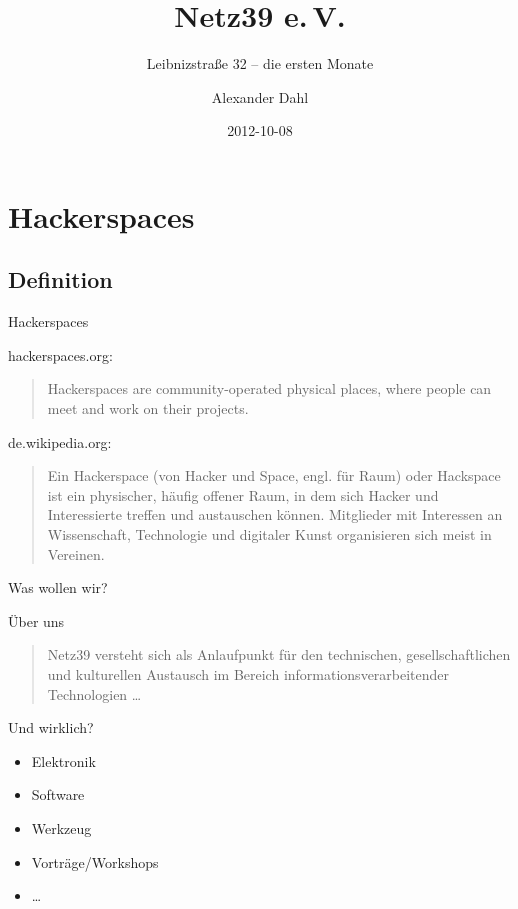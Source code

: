\documentclass[hyperref={pdfpagelabels=false}]{beamer}
\title[Netz39 e.\,V.]{Netz39 e.\,V.}
\subtitle{Leibnizstraße 32 -- die ersten Monate}
\author{Alexander Dahl}
\institute[netz39.de]{\url{http://www.netz39.de/}}
\date{2012-10-08}
\begin{document}
\begin{frame}
	\titlepage
\end{frame}


\section{Hackerspaces}

\subsection{Definition}

\begin{frame}{Hackerspaces}
    \begin{block}{hackerspaces.org:}
        \begin{quote}
            Hackerspaces are community-operated physical places, where
            people can meet and work on their projects.
        \end{quote}
    \end{block}
    \pause
    \begin{block}{de.wikipedia.org:}
        \begin{quote}
            Ein Hackerspace (von Hacker und Space, engl. für Raum) oder
            Hackspace ist ein physischer, häufig offener Raum, in dem
            sich Hacker und Interessierte treffen und austauschen
            können. Mitglieder mit Interessen an Wissenschaft,
            Technologie und digitaler Kunst organisieren sich meist in
            Vereinen.
        \end{quote}
    \end{block}
\end{frame}

\begin{frame}{Was wollen wir?}
    \begin{block}{Über uns}
        \begin{quote}
            Netz39 versteht sich als Anlaufpunkt für den technischen,
            gesellschaftlichen und kulturellen Austausch im Bereich
            informationsverarbeitender Technologien …
        \end{quote}
    \end{block}
    \begin{block}{Und wirklich?}
        \begin{itemize}
            \item Elektronik
            \item Software
            \item Werkzeug
            \item Vorträge/Workshops
            \item …
        \end{itemize}
    \end{block}
\end{frame}
\end{document}
